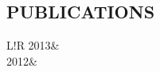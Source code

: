 \documentclass[line, margin]{res}
\newcommand\VRule{\color{lightgray}\vrule width 0.5pt}
\begin{document}
\begin{resume}
\section{PUBLICATIONS} 
\begin{tabular}{L!{\VRule}R}
  2013&\\[5pt]
  2012&\\
\end{tabular}

\end{resume}
\end{document}
